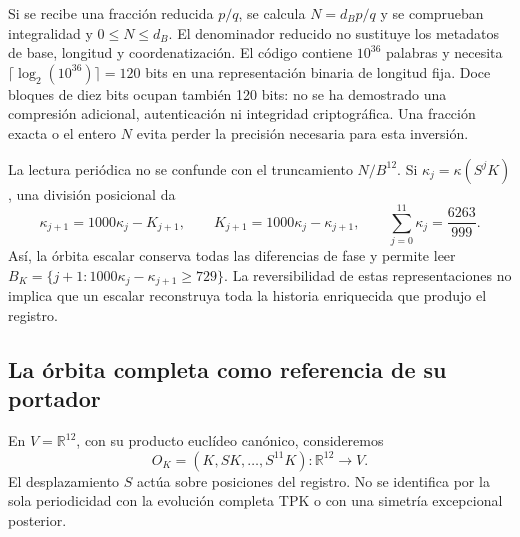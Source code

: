 Si se recibe una fracción reducida \(p/q\), se calcula
\(N=d_Bp/q\) y se comprueban integralidad y \(0\leq N\leq d_B\).
El denominador reducido no sustituye los metadatos de base, longitud y
coordenatización. El código contiene \(10^{36}\) palabras y necesita
\(\lceil\log_2(10^{36})\rceil=120\) bits en una representación binaria
de longitud fija. Doce bloques de diez bits ocupan también 120 bits: no se
ha demostrado una compresión adicional, autenticación ni integridad
criptográfica. Una fracción exacta o el entero \(N\) evita perder la
precisión necesaria para esta inversión.

La lectura periódica no se confunde con el truncamiento \(N/B^{12}\).
Si \(\kappa_j=\kappa(S^jK)\), una división posicional da
\begin{equation}
 \kappa_{j+1}=1000\kappa_j-K_{j+1},\qquad
 K_{j+1}=1000\kappa_j-\kappa_{j+1},\qquad
 \sum_{j=0}^{11}\kappa_j=\frac{6263}{999}.
 \label{lib01:orbita-kappa}
\end{equation}
Así, la órbita escalar conserva todas las diferencias de fase y permite
leer \(B_K=\{j+1:1000\kappa_j-\kappa_{j+1}\geq729\}\).
La reversibilidad de estas representaciones no implica que un escalar
reconstruya toda la historia enriquecida que produjo el registro.

\subsection{La órbita completa como referencia de su portador}
\label{lib01:orbita}

En \(V=\mathbb R^{12}\), con su producto euclídeo canónico, consideremos
\[
 O_K=(K,SK,\ldots,S^{11}K):\mathbb R^{12}\longrightarrow V.
\]
El desplazamiento \(S\) actúa sobre posiciones del registro. No se
identifica por la sola periodicidad con la evolución completa TPK o con
una simetría excepcional posterior.

